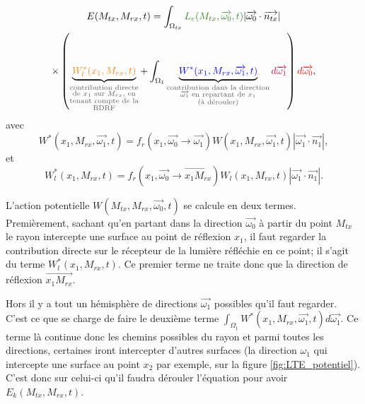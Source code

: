 \large \begin{multline}
    E(M_{tx}, M_{rx}, t) = \int_{\Omega_{tx}}
        \textcolor{OliveGreen}{L_e(M_{tx}, \overrightarrow{\omega_0}, t)}
        | \overrightarrow{\omega_0} \cdot \overrightarrow{n_{tx}} | \\
        \times \left(
        \underbrace{\textcolor{BurntOrange}{W_l^*(x_1, M_{rx}, t)}}
            _{\textcolor{DarkGray}
             {\substack{\text{contribution directe} \\
                        \text{de $x_1$ sur $M_{rx}$, en} \\
                        \text{tenant compte de la} \\
                        \text{BDRF}}}}
        + \int_{\Omega_1}
        \underbrace{\textcolor{blue}{W^*(x_1, M_{rx}, \overrightarrow{\omega_1}, t)}}
            _{\textcolor{DarkGray}
             {\substack{\text{contribution dans la direction} \\
                        \text{$\overrightarrow{\omega_1}$ en repartant de $x_1$} \\
                        \text{(à dérouler)}}}}
        \textcolor{purple}{d\overrightarrow{\omega_1}}
        \right)
        \textcolor{red}{d\overrightarrow{\omega_0}}
,\end{multline} \normalsize
avec
\large \begin{equation}
    W^*(x_1, M_{rx}, \overrightarrow{\omega_1}, t) = 
        f_r(x_1, \overrightarrow{\omega_0} \longrightarrow \overrightarrow{\omega_1})
        W(x_1, M_{rx}, \overrightarrow{\omega_1}, t)
        | \overrightarrow{\omega_1} \cdot \overrightarrow{n_1} |
,\end{equation} \normalsize
et
\large \begin{equation}
    W_l^*(x_1, M_{rx}, t) =
        f_r(x_1, \overrightarrow{\omega_0} \longrightarrow \overrightarrow{x_1 M_{rx}})
        W_l(x_1, M_{rx}, t)
        | \overrightarrow{\omega_1} \cdot \overrightarrow{n_1} |
.\end{equation} \normalsize

L'action potentielle $W(M_{tx}, M_{rx}, \overrightarrow{\omega_0}, t)$ se calcule en deux termes. Premièrement, sachant qu'en partant dans la direction $\overrightarrow{\omega_0}$ à partir du point $M_{tx}$ le rayon intercepte une surface au point de réflexion $x_1$, il faut regarder la contribution directe sur le récepteur de la lumière réfléchie en ce point; il s'agit du terme $W_l^*(x_1, M_{rx}, t)$. Ce premier terme ne traite donc que la direction de réflexion $\overrightarrow{x_1 M_{rx}}$.\par
Hors il y a tout un hémisphère de directions $\overrightarrow{\omega_1}$ possibles qu'il faut regarder. C'est ce que se charge de faire le deuxième terme $\int_{\Omega_1}W^*(x_1, M_{rx}, \overrightarrow{\omega_1}, t)d\overrightarrow{\omega_1}$. Ce terme là continue donc les chemins possibles du rayon et parmi toutes les directions, certaines iront intercepter d'autres surfaces (la direction $\omega_1$ qui intercepte une surface au point $x_2$ par exemple, sur la figure \ref{fig:LTE_potentiel}). C'est donc sur celui-ci qu'il faudra dérouler l'équation pour avoir $E_k(M_{tx}, M_{rx}, t)$.

